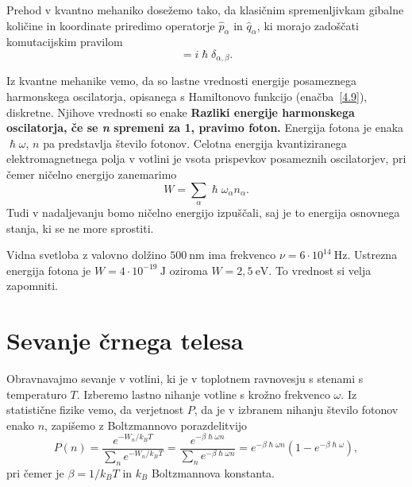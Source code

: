 Prehod v kvantno mehaniko dosežemo tako, da klasičnim spremenljivkam gibalne količine
in koordinate priredimo operatorje $\hat{p}_{\alpha}$ in $\hat{q}_{\alpha}$,
ki morajo zadoščati komutacijskim pravilom 
\begin{equation}
[\hat{q}_{\alpha},\hat{p}_{\beta}]=i\hslash \delta_{\alpha, \beta}.
\label{4.10}
\end{equation}

Iz kvantne mehanike vemo, da so lastne vrednosti energije posameznega harmonskega oscilatorja, 
opisanega s Hamiltonovo funkcijo (enačba~\ref{4.9}), diskretne. Njihove vrednosti so enake
{\bf Razliki energije harmonskega oscilatorja, če se \textit{\textbf{n}}
spremeni za 1, pravimo foton.} Energija
fotona je enaka $\hslash \omega$, $n$ pa predstavlja število fotonov. Celotna
energija kvantiziranega elektro\-magnetnega polja v votlini je vsota prispevkov
posameznih oscilatorjev, pri čemer ničelno energijo zanemarimo
\begin{equation}
W = \sum_\alpha \hslash \omega_\alpha n_\alpha.
\end{equation}
Tudi v nadaljevanju bomo ničelno energijo izpuščali, 
saj je to energija osnovnega stanja, ki se ne more sprostiti. 

\begin{remark}
Vidna svetloba z valovno dolžino $500~\si{\nano\metre}$ ima frekvenco
$\nu = 6 \cdot 10^{14}~\si{\hertz}$. Ustrezna energija fotona je
$W = 4 \cdot 10^{-19}~\si{\joule}$ oziroma $W = 2,5~\mathrm{e}\si{\volt}$.
To vrednost si velja zapomniti.
\end{remark}

\section{Sevanje črnega telesa}
Obravnavajmo sevanje v votlini, ki je v toplotnem ravnovesju s stenami s temperaturo
$T$. Izberemo lastno nihanje votline s krožno frekvenco $\omega$. Iz statistične fizike 
vemo, da verjetnost $P$, da je v izbranem  nihanju število fotonov enako $n$, 
zapišemo z Boltzmannovo porazdelitvijo
\begin{equation}
P(n)=\frac{e^{-W_{n}/k_BT}}{\sum_{n}e^{-W_{n}/k_BT}} = 
\frac{e^{-\beta\hslash\omega n}}
{\sum_{n}e^{-\beta\hslash\omega n}}=
e^{-\beta\hslash\omega n}(1-e^{-\beta\hslash\omega}),
\label{4.12}
\end{equation}
pri čemer je $\beta = 1/k_BT$ in $k_B$ Boltzmannova konstanta. 

